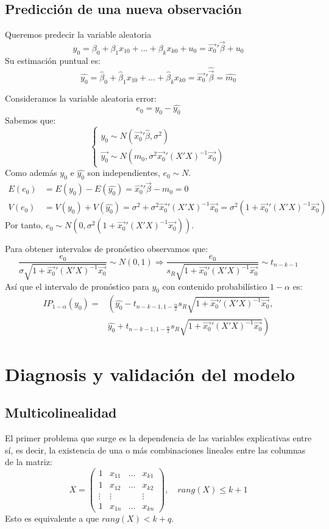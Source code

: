 \subsection*{Predicción de una nueva observación}
Queremos predecir la variable aleatoria
$$y_0 = \beta_0 + \beta_1x_{10} + \dots + \beta_kx_{k0} + u_0 = \vec{x_0}'\vec{\beta} + u_0$$
Su estimación puntual es:
$$\hat{y_0} = \hat{\beta}_0 + \hat{\beta}_1x_{10} + \dots + \hat{\beta}_kx_{k0} = \vec{x_0}'\hat{\vec{\beta}} = \hat{m_0}$$

Consideramos la variable aleatoria error:
$$e_0 = y_0 - \hat{y_0}$$
Sabemos que:
$$\begin{cases}
        y_0 \sim N(\vec{x_0}'\hat{\beta}, \sigma^2) \\
        \vec{y_0} \sim N(m_0, \sigma^2\vec{x_0}'(X'X)^{-1}\vec{x_0})
    \end{cases}$$
Como además $y_0$ e $\hat{y_0}$ son independientes, $e_0 \sim N$.
\begin{align*}
    E(e_0) & = E(y_0) - E(\hat{y_0}) = \vec{x_0}'\vec{\beta} - m_0 = 0                                                                 \\
    V(e_0) & = V(y_0) + V(\hat{y_0}) = \sigma^2 + \sigma^2\vec{x_0}'(X'X)^{-1}\vec{x_0} = \sigma^2 (1 + \vec{x_0}'(X'X)^{-1}\vec{x_0})
\end{align*}
Por tanto, $e_0 \sim N(0, \sigma^2 (1 + \vec{x_0}'(X'X)^{-1}\vec{x_0}))$.

Para obtener intervalos de pronóstico observamos que:
$$\frac{e_0}{\sigma\sqrt{1+\vec{x_0}'(X'X)^{-1}\vec{x_0}}} \sim N(0, 1) \Rightarrow \frac{e_0}{s_R\sqrt{1+\vec{x_0}'(X'X)^{-1}\vec{x_0}}} \sim t_{n-k-1}$$
Así que el intervalo de pronóstico para $y_0$ con contenido probabilístico $1-\alpha$ es:
\begin{align*}
    IP_{1-\alpha}(y_0) = & \left( \hat{y_0} - t_{n-k-1, 1-\frac{\alpha}{2}} s_R\sqrt{1+\vec{x_0}'(X'X)^{-1}\vec{x_0}}, \right. \\
                         & \left. \hat{y_0} + t_{n-k-1, 1-\frac{\alpha}{2}} s_R\sqrt{1+\vec{x_0}'(X'X)^{-1}\vec{x_0}} \right)
\end{align*}

\section{Diagnosis y validación del modelo}
\subsection*{Multicolinealidad}
El primer problema que surge es la dependencia de las variables explicativas entre sí, es decir, la existencia de una o más combinaciones lineales entre las columnas de la matriz:
$$X = \begin{pmatrix}
        1      & x_{11} & \dots & x_{k1} \\
        1      & x_{12} & \dots & x_{k2} \\
        \vdots & \vdots &       & \vdots \\
        1      & x_{1n} & \dots & x_{kn}
    \end{pmatrix}, \quad rang(X) \leq k+1$$
Esto es equivalente a que $rang(X) < k+q$.

